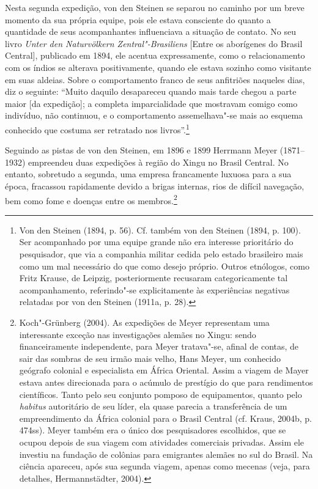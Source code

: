 Nesta segunda expedição, von den Steinen se separou no caminho por um
breve momento da sua própria equipe, pois ele estava consciente do
quanto a quantidade de seus acompanhantes influenciava a situação de
contato. No seu livro \emph{Unter den Naturvölkern Zentral"-Brasiliens}
{[}Entre os aborígenes do Brasil Central{]}, publicado em 1894, ele
acentua expressamente, como o relacionamento com os índios se alterava
positivamente, quando ele estava sozinho como visitante em suas aldeias.
Sobre o comportamento franco de seus anfitriões naqueles dias, diz o
seguinte: ``Muito daquilo desapareceu quando mais tarde chegou a parte
maior {[}da expedição{]}; a completa imparcialidade que mostravam
comigo como indivíduo, não continuou, e o comportamento assemelhava"-se
mais ao esquema conhecido que costuma ser retratado nos
livros''.\footnote{Von den Steinen (1894, p. 56). Cf. também von den
  Steinen (1894, p. 100). Ser acompanhado por uma equipe grande não era
  interesse prioritário do pesquisador, que via a companhia militar
  cedida pelo estado brasileiro mais como um mal necessário do que como
  desejo próprio. Outros etnólogos, como Fritz Krause, de Leipzig,
  posteriormente recusaram categoricamente tal acompanhamento,
  referindo"-se explicitamente às experiências negativas relatadas por
  von den Steinen (1911a, p. 28).}

Seguindo as pistas de von den Steinen, em 1896 e 1899 Herrmann Meyer
(1871--1932) empreendeu duas expedições à região do Xingu no Brasil
Central. No entanto, sobretudo a segunda, uma empresa francamente
luxuosa para a sua época, fracassou rapidamente devido a brigas
internas, rios de difícil navegação, bem como fome e doenças entre os
membros.\footnote{Koch"-Grünberg (2004). As expedições de Meyer
  representam uma interessante exceção nas investigações alemães no
  Xingu: sendo financeiramente independente, para Meyer tratava"-se,
  afinal de contas, de sair das sombras de seu irmão mais velho, Hans
  Meyer, um conhecido geógrafo colonial e especialista em África
  Oriental. Assim a viagem de Mayer estava antes direcionada para o
  acúmulo de prestígio do que para rendimentos científicos. Tanto pelo
  seu conjunto pomposo de equipamentos, quanto pelo \emph{habitus}
  autoritário de seu líder, ela quase parecia a transferência de um
  empreendimento da África colonial para o Brasil Central (cf. Kraus,
  2004b, p. 474ss). Meyer também era o único dos pesquisadores
  escolhidos, que se ocupou depois de sua viagem com atividades
  comerciais privadas. Assim ele investiu na fundação de colônias para
  emigrantes alemães no sul do Brasil. Na ciência apareceu, após sua
  segunda viagem, apenas como mecenas (veja, para detalhes,
  Hermannstädter, 2004).}

